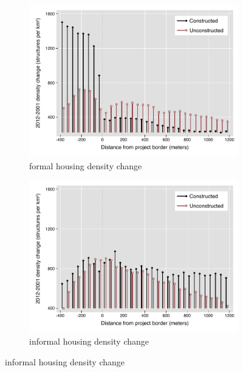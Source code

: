 \documentclass[12pt]{article}
\begin{document}
\begin{figure}[t!]
        \centering
        \caption[ Changes in Housing Densities in Constructed and Unconstructed Projects Areas]
        {\small Housing Densities in Constructed and Unconstructed projects } 
        \begin{subfigure}[b]{0.495\textwidth}   
            \centering 
            \includegraphics[width=\textwidth,trim={0.3cm .3cm 0.1cm 0cm}, clip=true]{figures/bblu_for_rawchanges_5.pdf}
            \caption[]%
            {{\small formal housing density change}}    
            \label{fig:forchange}
        \end{subfigure}
        \hfill
        \begin{subfigure}[b]{0.495\textwidth}   
            \centering 
            \includegraphics[width=\textwidth,trim={0.3cm .3cm 0.1cm 0cm}, clip=true]{figures/bblu_inf_rawchanges_5.pdf}
            \caption[]%
            {{\small informal housing density change}}    
            \label{fig:infchange}
        \end{subfigure}
        \label{fig:rawbblumeanschange}
        \vspace{-6mm}
    \end{figure} 
\end{document}
